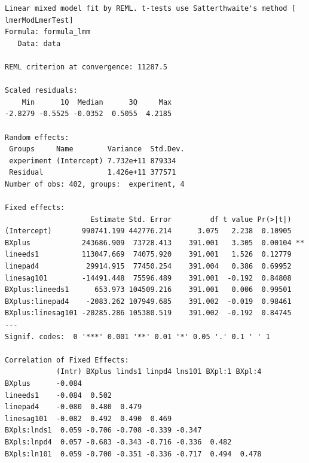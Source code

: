 \documentclass[
  10pt,
]{article}
\begin{document}
\begin{verbatim}
Linear mixed model fit by REML. t-tests use Satterthwaite's method [
lmerModLmerTest]
Formula: formula_lmm
   Data: data

REML criterion at convergence: 11287.5

Scaled residuals: 
    Min      1Q  Median      3Q     Max 
-2.8279 -0.5525 -0.0352  0.5055  4.2185 

Random effects:
 Groups     Name        Variance  Std.Dev.
 experiment (Intercept) 7.732e+11 879334  
 Residual               1.426e+11 377571  
Number of obs: 402, groups:  experiment, 4

Fixed effects:
                    Estimate Std. Error         df t value Pr(>|t|)   
(Intercept)       990741.199 442776.214      3.075   2.238  0.10905   
BXplus            243686.909  73728.413    391.001   3.305  0.00104 **
lineeds1          113047.669  74075.920    391.001   1.526  0.12779   
linepad4           29914.915  77450.254    391.004   0.386  0.69952   
linesag101        -14491.448  75596.489    391.001  -0.192  0.84808   
BXplus:lineeds1      653.973 104509.216    391.001   0.006  0.99501   
BXplus:linepad4    -2083.262 107949.685    391.002  -0.019  0.98461   
BXplus:linesag101 -20285.286 105380.519    391.002  -0.192  0.84745   
---
Signif. codes:  0 '***' 0.001 '**' 0.01 '*' 0.05 '.' 0.1 ' ' 1

Correlation of Fixed Effects:
            (Intr) BXplus linds1 linpd4 lns101 BXpl:1 BXpl:4
BXplus      -0.084                                          
lineeds1    -0.084  0.502                                   
linepad4    -0.080  0.480  0.479                            
linesag101  -0.082  0.492  0.490  0.469                     
BXpls:lnds1  0.059 -0.706 -0.708 -0.339 -0.347              
BXpls:lnpd4  0.057 -0.683 -0.343 -0.716 -0.336  0.482       
BXpls:ln101  0.059 -0.700 -0.351 -0.336 -0.717  0.494  0.478
\end{verbatim}
\end{document}
